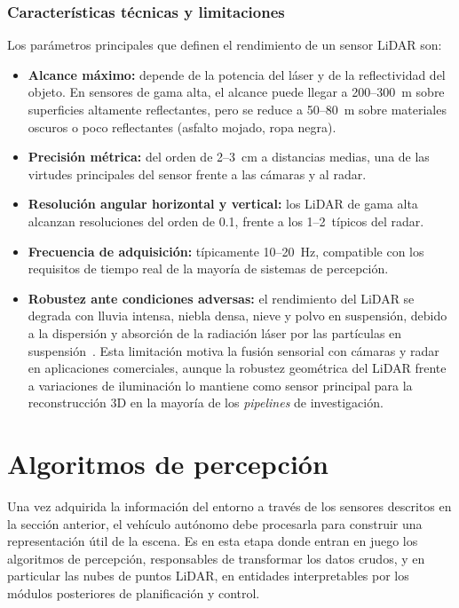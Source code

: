 \subsubsection{Características técnicas y limitaciones}
\label{sec:lidar-limitaciones}

Los parámetros principales que definen el rendimiento de un sensor
LiDAR son:

\begin{itemize}
    \item \textbf{Alcance máximo:} depende de la potencia del láser y
    de la reflectividad del objeto. En sensores de gama alta, el
    alcance puede llegar a 200--300~m sobre superficies altamente
    reflectantes, pero se reduce a 50--80~m sobre materiales oscuros o
    poco reflectantes (asfalto mojado, ropa negra).
    \item \textbf{Precisión métrica:} del orden de 2--3~cm a distancias
    medias, una de las virtudes principales del sensor frente a las
    cámaras y al radar.
    \item \textbf{Resolución angular horizontal y vertical:} los LiDAR
    de gama alta alcanzan resoluciones del orden de 0.1\textdegree,
    frente a los 1--2\textdegree\ típicos del radar.
    \item \textbf{Frecuencia de adquisición:} típicamente 10--20~Hz,
    compatible con los requisitos de tiempo real de la mayoría de
    sistemas de percepción.
    \item \textbf{Robustez ante condiciones adversas:} el rendimiento
    del LiDAR se degrada con lluvia intensa, niebla densa, nieve y
    polvo en suspensión, debido a la dispersión y absorción de la
    radiación láser por las partículas en
    suspensión~\cite{bijelic2020fog}. Esta limitación motiva la fusión
    sensorial con cámaras y radar en aplicaciones comerciales, aunque
    la robustez geométrica del LiDAR frente a variaciones de
    iluminación lo mantiene como sensor principal para la
    reconstrucción 3D en la mayoría de los \textit{pipelines} de
    investigación.
\end{itemize}

\section{Algoritmos de percepción}
\label{sec:algoritmos-percepcion}

Una vez adquirida la información del entorno a través de los sensores
descritos en la sección anterior, el vehículo autónomo debe procesarla
para construir una representación útil de la escena. Es en esta etapa
donde entran en juego los algoritmos de percepción, responsables de
transformar los datos crudos, y en particular las nubes de puntos
LiDAR, en entidades interpretables por los módulos posteriores de
planificación y control.

